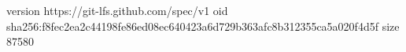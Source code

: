 version https://git-lfs.github.com/spec/v1
oid sha256:f8fec2ea2c44198fe86ed08ec640423a6d729b363afc8b312355ca5a020f4d5f
size 87580
